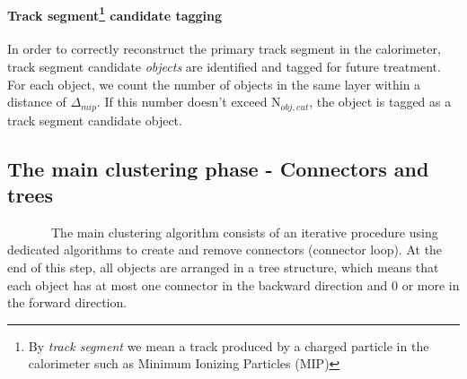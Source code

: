 \documentclass[cits]{JINST}
\begin{document}
\paragraph*{Track segment\footnote{By \textit{track segment} we mean a track produced by a charged particle in the calorimeter such as Minimum Ionizing Particles (MIP)} candidate tagging}
In order to correctly reconstruct the primary track segment in the calorimeter, track segment candidate \textit{objects} are identified and tagged for future treatment. For each object, we count the number of objects in the same layer within a distance of $\Delta_{mip}$. If this number doesn't exceed N$_{obj,cut}$, the object is tagged as a track segment candidate object.

\subsection*{The main clustering phase - Connectors and trees}

~~~~~~~The main clustering algorithm consists of an iterative procedure using dedicated algorithms to create and remove connectors (connector loop). At the end of this step, all objects are arranged in a tree structure, which means that each object has at most one connector in the backward direction and 0 or more in the forward direction.
\end{document}

